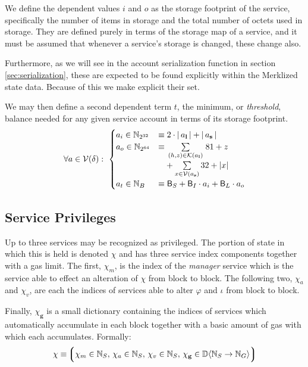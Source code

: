 We define the dependent values $i$ and $o$ as the storage footprint of the service, specifically the number of items in storage and the total number of octets used in storage. They are defined purely in terms of the storage map of a service, and it must be assumed that whenever a service's storage is changed, these change also.

Furthermore, as we will see in the account serialization function in section \ref{sec:serialization}, these are expected to be found explicitly within the Merklized state data. Because of this we make explicit their set.

We may then define a second dependent term $t$, the minimum, or \emph{threshold}, balance needed for any given service account in terms of its storage footprint.
\begin{align}
  \forall a \in \mathcal{V}(\delta):\ \begin{cases}
    a_i \in \mathbb{N}_{2^{32}} &\equiv 2\cdot|\,a_\mathbf{l}\,| + |\,a_\mathbf{s}\,| \\
    a_o \in \mathbb{N}_{2^{64}} &\equiv \sum\limits_{\,(h, z) \in \mathcal{K}(a_\mathbf{l})\,} 81 + z \\
    &\phantom{\equiv} + \sum\limits_{x \in \mathcal{V}(a_\mathbf{s})} 32 + |x| \\
    a_t \in \mathbb{N}_B &\equiv \mathsf{B}_S + \mathsf{B}_I \cdot a_i + \mathsf{B}_L \cdot a_o
  \end{cases}
\end{align}





\subsection{Service Privileges}
Up to three services may be recognized as privileged. The portion of state in which this is held is denoted $\chi$ and has three service index components together with a gas limit. The first, $\chi_m$, is the index of the \emph{manager} service which is the service able to effect an alteration of $\chi$ from block to block. The following two, $\chi_a$ and $\chi_v$, are each the indices of services able to alter $\varphi$ and $\iota$ from block to block.

Finally, $\chi_\mathbf{g}$ is a small dictionary containing the indices of services which automatically accumulate in each block together with a basic amount of gas with which each accumulates. Formally:
\begin{align}
  \chi \equiv \tuple{
    \isa{\chi_m}{\N_S} \ts
    \isa{\chi_a}{\N_S} \ts
    \isa{\chi_v}{\N_S} \ts
    \isa{\chi_\mathbf{g}}{\dict{\N_S}{\N_G}}
  }
\end{align}
